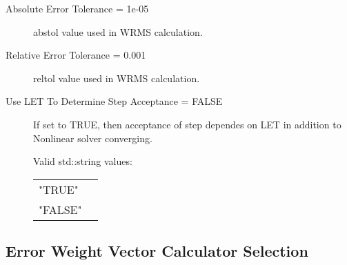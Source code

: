 \begin{list}{}
\begin{description}
      \item[Absolute Error Tolerance = 1e-05] 
abstol value used in WRMS calculation.
      \item[Relative Error Tolerance = 0.001] 
reltol value used in WRMS calculation.
      \item[Use LET To Determine Step Acceptance = FALSE] 
If set to TRUE, then acceptance of step dependes on LET in addition to Nonlinear solver converging.

  Valid std::string values:

      \begin{tabular}{lp{}}
      "TRUE" & \\ 
      "FALSE" & \\ 
      \end{tabular}
\end{description}

\end{list}

\subsection{Error Weight Vector Calculator Selection}
\label{sec:Error Weight Vector Calculator Selection}

